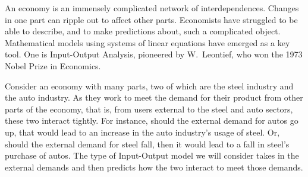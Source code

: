 An economy is an immensely complicated network of interdependences.
Changes in one part can ripple out to affect other parts.
Economists have struggled to be able to describe, and to make
predictions about, such a complicated object.
Mathematical models using systems of linear equations
have emerged as a key tool.
One is Input-Output Analysis, pioneered by 
W.~Leontief, 
who won the 1973 Nobel Prize in Economics.

Consider an economy with many parts, two of which are the steel industry and
the auto industry.
As they work to meet the demand for their product
from other parts of the economy, that is, from users external to the steel and
auto sectors, these two interact tightly.
For instance, should the external demand for autos go up, that would lead to
an increase in the auto industry's usage of steel.
Or, should the external demand for steel fall, then it would lead to a fall in
steel's purchase of autos.
The type of Input-Output model we will consider takes in the external demands
and then predicts how the two interact to meet those demands.

